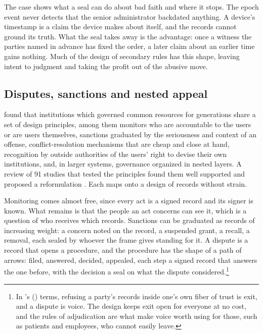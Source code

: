 The case shows what a seal can do about bad faith and where it stops. The epoch event never detects
that the senior administrator backdated anything. A device's timestamp is a claim the device makes
about itself, and the records cannot ground its truth. What the seal takes away is the advantage:
once a witness the parties named in advance has fixed the order, a later claim about an earlier time
gains nothing. Much of the design of secondary rules has this shape, leaving intent to judgment and
taking the profit out of the abusive move.

\subsection{Disputes, sanctions and nested appeal}\label{sec:disputes}

\citet[Table~3.1, p.~90]{ostrom1990} found that institutions which governed common resources for generations share a
set of design principles, among them monitors who are accountable to the users or are users
themselves, sanctions graduated by the seriousness and context of an offense, conflict-resolution
mechanisms that are cheap and close at hand, recognition by outside authorities of the users' right
to devise their own institutions, and, in larger systems, governance organized in nested layers. A
review of 91 studies that tested the principles found them well supported and proposed a
reformulation \citep{cox2010}. Each maps onto a design of records without strain.

Monitoring comes almost free, since every act is a signed record and its signer is known. What
remains is that the people an act concerns can see it, which is a question of who receives which
records. Sanctions can be graduated as records of increasing weight: a concern noted on the record,
a suspended grant, a recall, a removal, each sealed by whoever the frame gives standing for it. A
dispute is a record that opens a procedure, and the procedure has the shape of a path of arrows:
filed, answered, decided, appealed, each step a signed record that answers the one before, with the
decision a seal on what the dispute considered.\footnote{In \citeauthor{hirschman1970}'s
(\citeyear{hirschman1970}) terms, refusing a party's records inside one's own fiber of trust is exit,
and a dispute is voice. The design keeps exit open for everyone at no cost, and the rules of
adjudication are what make voice worth using for those, such as patients and employees, who cannot
easily leave.}

